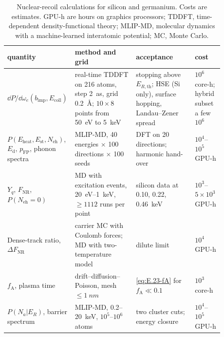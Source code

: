\begin{table}[t]
  \caption{Nuclear-recoil calculations for silicon and germanium. Costs are estimates. GPU-h are hours on graphics processors; TDDFT, time-dependent density-functional theory; MLIP-MD, molecular dynamics with a machine-learned interatomic potential; MC, Monte Carlo.}
  \label{tab:E23-summary}
  \centering
  \small
  \begin{tabular}{p{0.19\linewidth}p{0.29\linewidth}p{0.27\linewidth}p{0.13\linewidth}}
    \toprule
    quantity & method and grid & acceptance & cost \\
    \midrule
    $\dd P/\dd\omega_e(b_{\mathrm{imp}}, E_{\mathrm{coll}})$ & real-time TDDFT on 216 atoms, step \SI{2}{as}, grid \SI{0.2}{\angstrom}; $10\times8$ points from \SI{50}{eV} to \SI{5}{keV} & stopping above $E_{R,\mathrm{th}}$; HSE (Si only), surface hopping, Landau--Zener spread & $10^6$ core-h; hybrid subset a few $10^6$ \\
    $P(E_{\mathrm{heat}}, E_{\mathrm{st}}, N_{\mathrm{eh}})$, $E_{\mathrm{d}}$, $p_{\mathrm{FP}}$, phonon spectra & MLIP-MD, 40 energies $\times$ 100 directions $\times$ 100 seeds & DFT on 20 directions; harmonic hand-over & $10^4$--$10^5$ GPU-h \\
    $Y_q$, $F_{\mathrm{NR}}$, $P(N_{\mathrm{eh}} = 0)$ & MD with excitation events, \SI{20}{eV}--\SI{1}{keV}, $\ge 1112$ runs per point & silicon data at 0.10, 0.22, \SI{0.46}{keV} & $10^3$--$5\times10^3$ GPU-h \\
    Dense-track ratio, $\Delta F_{\mathrm{NR}}$ & carrier MC with Coulomb forces; MD with two-temperature model & dilute limit & $10^4$ GPU-h \\
    $f_{\mathrm{A}}$, plasma time & drift--diffusion--Poisson, mesh $\le\SI{1}{nm}$ & \cref{eq:E.23-fA} for $f_{\mathrm{A}} \ll 0.1$ & $10^3$ core-h \\
    $P(N_a|E_R)$, barrier spectrum & MLIP-MD, 0.2--\SI{20}{keV}, $10^5$--$10^6$ atoms & two cluster cuts; energy closure & $10^4$--$10^5$ GPU-h \\
    \bottomrule
  \end{tabular}
\end{table}
